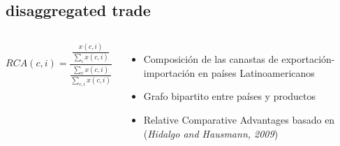 \documentclass[compress]{beamer}
\begin{document}
\subsection{disaggregated trade}
\begin{frame}

\begin{columns}[c] 

$$
RCA(c,i)= \frac{\displaystyle \frac{x(c,i)}{\displaystyle \sum_{i}x(c,i)}}{\frac{\displaystyle\sum_{c}x(c,i)}{\displaystyle \sum_{c,i}x(c,i)}}
$$	
\small

\begin{itemize}
	
	\item[\faRebel] Composición de las canastas de exportación-importación en países Latinoamericanos 
	\item[\faRebel] Grafo bipartito entre países y productos
	\item[\faRebel] Relative Comparative Advantages basado en 	(\textit{Hidalgo and Hausmann, 2009})
\end{itemize}

\end{columns}



\end{frame}
\end{document}
